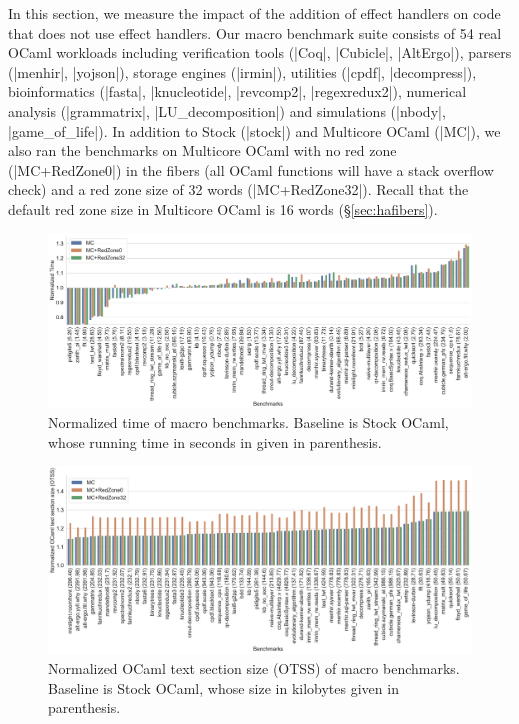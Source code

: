 \documentclass[sigplan,screen]{acmart}
\begin{document}
In this section, we measure the impact of the addition of effect handlers on
code that does not use effect handlers. Our macro benchmark suite consists of
54 real OCaml workloads including verification tools (|Coq|, |Cubicle|,
|AltErgo|), parsers (|menhir|, |yojson|), storage engines (|irmin|), utilities
(|cpdf|, |decompress|), bioinformatics (|fasta|, |knucleotide|, |revcomp2|,
|regexredux2|), numerical analysis (|grammatrix|, |LU_decomposition|) and
simulations (|nbody|, |game_of_life|). In addition to Stock (|stock|) and
Multicore OCaml (|MC|), we also ran the benchmarks on Multicore OCaml with no
red zone (|MC+RedZone0|) in the fibers (all OCaml functions will have a stack
overflow check) and a red zone size of 32 words (|MC+RedZone32|). Recall that
the default red zone size in Multicore OCaml is 16 words (\S\ref{sec:hafibers}).

\begin{figure}
	\includegraphics[scale=0.35]{sandmark-notebook/sandmark_time}
	\caption{Normalized time of macro benchmarks. Baseline is Stock OCaml,
		whose running time in seconds in given in parenthesis.}
	\label{res:macro_time}
\end{figure}

\begin{figure}
	\includegraphics[scale=0.35]{sandmark-notebook/sandmark_codesize}
	\caption{Normalized OCaml text section size (OTSS) of macro benchmarks.
	Baseline is Stock OCaml, whose size in kilobytes given in parenthesis.}
	\label{res:macro_size}
\end{figure}
\end{document}
